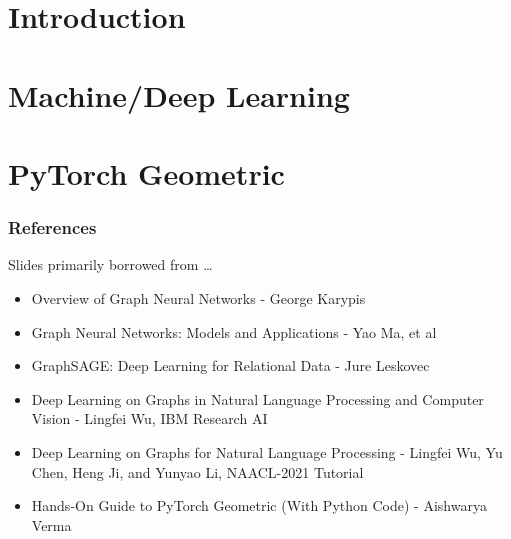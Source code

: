 \section[Intro]{Introduction}


\section[MLDL]{Machine/Deep Learning}


\section[PyG]{PyTorch Geometric}


\begin{frame}[fragile]\frametitle{References}
Slides primarily borrowed from \ldots

\begin{itemize}
\item Overview of Graph Neural Networks - George Karypis
\item Graph Neural Networks: Models and Applications - Yao Ma, et al
\item GraphSAGE: Deep Learning for Relational Data - Jure Leskovec
\item Deep Learning on Graphs in Natural Language Processing and Computer Vision - Lingfei Wu, IBM Research AI
\item Deep Learning on Graphs for Natural Language Processing - Lingfei Wu, Yu Chen, Heng Ji, and Yunyao Li, NAACL-2021 Tutorial
\item Hands-On Guide to PyTorch Geometric (With Python Code) - Aishwarya Verma
\end{itemize}

\end{frame}
